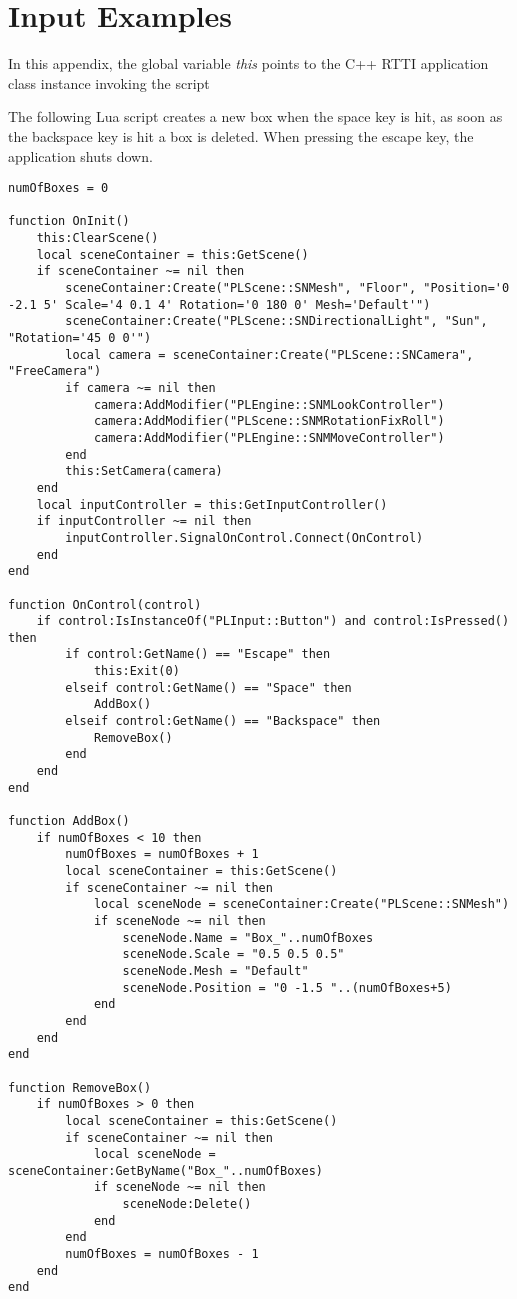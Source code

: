 \chapter{Input Examples}
In this appendix, the global variable \emph{this} points to the C++ \ac{RTTI} application class instance invoking the script 

The following Lua script creates a new box when the space key is hit, as soon as the backspace key is hit a box is deleted. When pressing the escape key, the application shuts down.
\begin{lstlisting}
numOfBoxes = 0

function OnInit()
	this:ClearScene()
	local sceneContainer = this:GetScene()
	if sceneContainer ~= nil then
		sceneContainer:Create("PLScene::SNMesh", "Floor", "Position='0 -2.1 5' Scale='4 0.1 4' Rotation='0 180 0' Mesh='Default'")
		sceneContainer:Create("PLScene::SNDirectionalLight", "Sun", "Rotation='45 0 0'")
		local camera = sceneContainer:Create("PLScene::SNCamera", "FreeCamera")
		if camera ~= nil then
			camera:AddModifier("PLEngine::SNMLookController")
			camera:AddModifier("PLScene::SNMRotationFixRoll")
			camera:AddModifier("PLEngine::SNMMoveController")
		end
		this:SetCamera(camera)
	end
	local inputController = this:GetInputController()
	if inputController ~= nil then
		inputController.SignalOnControl.Connect(OnControl)
	end
end

function OnControl(control)
	if control:IsInstanceOf("PLInput::Button") and control:IsPressed() then
		if control:GetName() == "Escape" then
			this:Exit(0)
		elseif control:GetName() == "Space" then
			AddBox()
		elseif control:GetName() == "Backspace" then
			RemoveBox()
		end
	end
end

function AddBox()
	if numOfBoxes < 10 then
		numOfBoxes = numOfBoxes + 1
		local sceneContainer = this:GetScene()
		if sceneContainer ~= nil then
			local sceneNode = sceneContainer:Create("PLScene::SNMesh")
			if sceneNode ~= nil then
				sceneNode.Name = "Box_"..numOfBoxes
				sceneNode.Scale = "0.5 0.5 0.5"
				sceneNode.Mesh = "Default"
				sceneNode.Position = "0 -1.5 "..(numOfBoxes+5)
			end
		end
	end
end

function RemoveBox()
	if numOfBoxes > 0 then
		local sceneContainer = this:GetScene()
		if sceneContainer ~= nil then
			local sceneNode = sceneContainer:GetByName("Box_"..numOfBoxes)
			if sceneNode ~= nil then
				sceneNode:Delete()
			end
		end
		numOfBoxes = numOfBoxes - 1
	end
end
\end{lstlisting}
